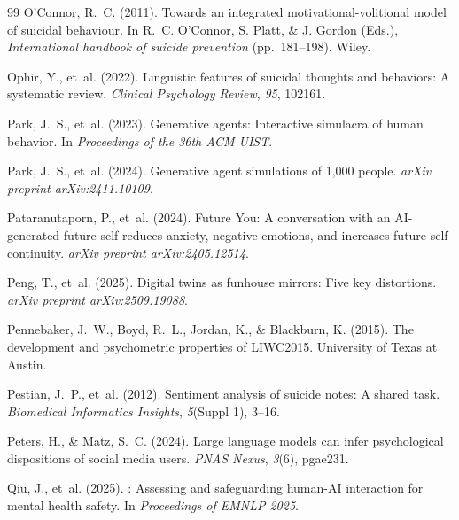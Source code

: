 \documentclass[review,12pt,authoryear]{elsarticle}
\begin{document}
\begin{thebibliography}{99}
O'Connor, R.~C. (2011).
\newblock Towards an integrated motivational-volitional model of suicidal behaviour.
\newblock In R.~C. O'Connor, S. Platt, \& J. Gordon (Eds.), \textit{International handbook of suicide prevention} (pp.\ 181--198). Wiley.

Ophir, Y., et~al. (2022).
\newblock Linguistic features of suicidal thoughts and behaviors: {A} systematic review.
\newblock \textit{Clinical Psychology Review}, \textit{95}, 102161.

Park, J.~S., et~al. (2023).
\newblock Generative agents: {I}nteractive simulacra of human behavior.
\newblock In \textit{Proceedings of the 36th ACM UIST}.

Park, J.~S., et~al. (2024).
\newblock Generative agent simulations of 1,000 people.
\newblock \textit{arXiv preprint arXiv:2411.10109}.

Pataranutaporn, P., et~al. (2024).
\newblock Future {Y}ou: {A} conversation with an {AI}-generated future self reduces anxiety, negative emotions, and increases future self-continuity.
\newblock \textit{arXiv preprint arXiv:2405.12514}.

Peng, T., et~al. (2025).
\newblock Digital twins as funhouse mirrors: {F}ive key distortions.
\newblock \textit{arXiv preprint arXiv:2509.19088}.

Pennebaker, J.~W., Boyd, R.~L., Jordan, K., \& Blackburn, K. (2015).
\newblock The development and psychometric properties of {LIWC2015}.
\newblock University of Texas at Austin.

Pestian, J.~P., et~al. (2012).
\newblock Sentiment analysis of suicide notes: {A} shared task.
\newblock \textit{Biomedical Informatics Insights}, \textit{5}(Suppl 1), 3--16.

Peters, H., \& Matz, S.~C. (2024).
\newblock Large language models can infer psychological dispositions of social media users.
\newblock \textit{PNAS Nexus}, \textit{3}(6), pgae231.

Qiu, J., et~al. (2025).
: {A}ssessing and safeguarding human-{AI} interaction for mental health safety.
\newblock In \textit{Proceedings of EMNLP 2025}.


\end{thebibliography}
\end{document}
